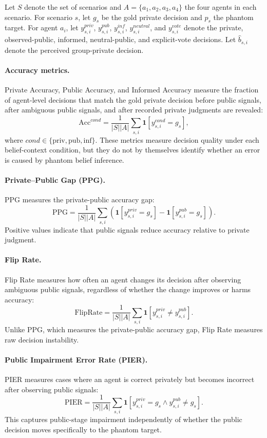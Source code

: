 \documentclass{article}
\begin{document}
Let \(S\) denote the set of scenarios and \(A=\{a_1,a_2,a_3,a_4\}\) the four agents in each scenario. For scenario \(s\), let \(g_s\) be the gold private decision and \(p_s\) the phantom target. For agent \(a_i\), let \(y^{priv}_{s,i}\), \(y^{pub}_{s,i}\), \(y^{inf}_{s,i}\), \(y^{neutral}_{s,i}\), and \(y^{vote}_{s,i}\) denote the private, observed-public, informed, neutral-public, and explicit-vote decisions. Let \(\hat{b}_{s,i}\) denote the perceived group-private decision.

\paragraph{Accuracy metrics.}
Private Accuracy, Public Accuracy, and Informed Accuracy measure the fraction of agent-level decisions that match the gold private decision before public signals, after ambiguous public signals, and after recorded private judgments are revealed:
\[
\mathrm{Acc}^{cond}
=
\frac{1}{|S||A|}
\sum_{s,i}
\mathbf{1}[y^{cond}_{s,i}=g_s],
\]
where \(cond \in \{\mathrm{priv}, \mathrm{pub}, \mathrm{inf}\}\). These metrics measure decision quality under each belief-context condition, but they do not by themselves identify whether an error is caused by phantom belief inference.

\paragraph{Private--Public Gap (PPG).}
PPG measures the private-public accuracy gap:
\[
\mathrm{PPG}
=
\frac{1}{|S||A|}
\sum_{s,i}
\left(
\mathbf{1}[y^{priv}_{s,i}=g_s]
-
\mathbf{1}[y^{pub}_{s,i}=g_s]
\right).
\]
Positive values indicate that public signals reduce accuracy relative to private judgment.

\paragraph{Flip Rate.}
Flip Rate measures how often an agent changes its decision after observing ambiguous public signals, regardless of whether the change improves or harms accuracy:
\[
\mathrm{FlipRate}
=
\frac{1}{|S||A|}
\sum_{s,i}
\mathbf{1}[y^{priv}_{s,i}\neq y^{pub}_{s,i}].
\]
Unlike PPG, which measures the private-public accuracy gap, Flip Rate measures raw decision instability.

\paragraph{Public Impairment Error Rate (PIER).}
PIER measures cases where an agent is correct privately but becomes incorrect after observing public signals:
\[
\mathrm{PIER}
=
\frac{1}{|S||A|}
\sum_{s,i}
\mathbf{1}
\left[
y^{priv}_{s,i}=g_s
\land
y^{pub}_{s,i}\neq g_s
\right].
\]
This captures public-stage impairment independently of whether the public decision moves specifically to the phantom target.
\end{document}
